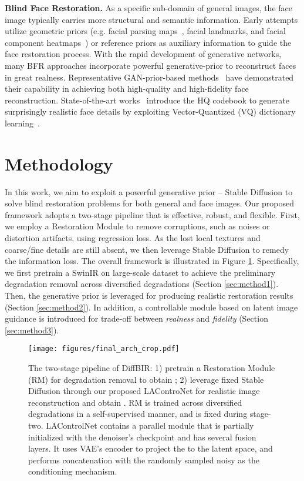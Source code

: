 \documentclass{article}
\begin{document}
\noindent\textbf{Blind Face Restoration.}
As a specific sub-domain of general images, the face image typically carries more structural and semantic information. Early attempts utilize geometric priors (e.g. facial parsing maps~\cite{face_geo_prior_1}, facial landmarks\cite{fsrnet, face_geo_prior_2}, and facial component heatmaps~\cite{yu2018face}) or reference priors\cite{XiaomingLi2018LearningWG, XiaomingLi2020EnhancedBF, XiaomingLi2020BlindFR, BerkDogan2019ExemplarGF} as auxiliary information to guide the face restoration process. With the rapid development of generative networks, many BFR approaches incorporate powerful generative-prior to reconstruct faces in great realness. Representative GAN-prior-based methods~\cite{gfpgan, gpen, gcfsr, glean} have demonstrated their capability in achieving both high-quality and high-fidelity face reconstruction. State-of-the-art works~\cite{codeformer, vqfr, restoreformer} introduce the HQ codebook to generate surprisingly realistic face details by exploiting Vector-Quantized (VQ) dictionary learning~\cite{vqvae, vqgan}. 


\section{Methodology}
\label{method}
In this work, we aim to exploit a powerful generative prior -- Stable Diffusion to solve blind restoration problems for both general and face images. Our proposed framework adopts a two-stage pipeline that is effective, robust, and flexible.
First, we employ a Restoration Module to remove corruptions, such as noises or distortion artifacts, using regression loss.
As the lost local textures and coarse/fine details are still absent, we then leverage Stable Diffusion to remedy the information loss.
The overall framework is illustrated in Figure \ref{fig:architecture}. Specifically, we first pretrain a SwinIR \cite{swinir} on large-scale dataset to achieve the preliminary degradation removal across diversified degradations (Section \ref{sec:method1}).  
Then, the generative prior is leveraged for producing realistic restoration results (Section \ref{sec:method2}).
In addition, a controllable module based on latent image guidance is introduced for trade-off between \textit{realness} and \textit{fidelity}  (Section \ref{sec:method3}). 

\begin{figure}[h]
\centering
    \texttt{[image: figures/final\_arch\_crop.pdf]}
\caption{\small The two-stage pipeline of DiffBIR: 1) pretrain a Restoration Module (RM) for degradation removal to obtain ; 2) leverage fixed Stable Diffusion through our proposed LAControNet for realistic image reconstruction and obtain . RM is trained across diversified degradations in a self-supervised manner, and is fixed during stage-two. LAControlNet contains a parallel module that is partially initialized with the denoiser's checkpoint and has several fusion layers. It uses VAE's encoder to project the  to the latent space, and performs concatenation with the randomly sampled noisy  as the conditioning mechanism.}
    \label{fig:architecture} \vspace{-1em}
\end{figure}
\end{document}
